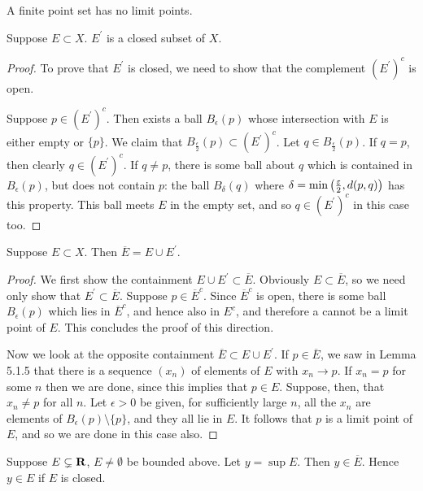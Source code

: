 \begin{corollary}
A finite point set has no limit points.
\end{corollary}

\begin{proposition}
Suppose $E\subset X$. $E^\prime$ is a closed subset of $X$.
\end{proposition}

\begin{proof}
To prove that $E^\prime$ is closed, we need to show that the complement $(E^\prime)^c$ is open.

Suppose $p\in (E^\prime)^c$. Then exists a ball $B_\epsilon(p)$ whose intersection with $E$ is either empty or $\{p\}$. We claim that $B_\frac{\epsilon}{2}(p)\subset (E^\prime)^c$. Let $q\in B_\frac{\epsilon}{2}(p)$. If $q=p$, then clearly $q\in (E^\prime)^c$. If $q\neq p$, there is some ball about $q$ which is contained in $B_\epsilon(p)$, but does not contain $p$: the ball $B_\delta(q)$ where $\delta=\min\left(\frac{\varepsilon}{2},d(p,q)\right)$ has this property. This ball meets $E$ in the empty set, and so $q\in (E^\prime)^c$ in this case too.
\end{proof}

\begin{proposition}
Suppose $E\subset X$. Then $\overline{E}=E\cup E^\prime$.
\end{proposition}

\begin{proof}
We first show the containment $E\cup E^\prime\subset\overline{E}$. Obviously $E\subset\overline{E}$, so we need only show that $E^\prime\subset\overline{E}$. Suppose $p\in\overline{E}^c$. Since $\overline{E}^c$ is open, there is some ball $B_\epsilon(p)$ which lies in $\overline{E}^c$, and hence also in $E^c$, and therefore a cannot be a limit point of $E$. This concludes the proof of this direction.

Now we look at the opposite containment $\overline{E}\subset E\cup E^\prime$. If $p\in\overline{E}$, we saw in Lemma 5.1.5 that there is a sequence  $(x_n)$ of elements of $E$ with $x_n\to p$. If $x_n=p$ for some $n$ then we are done, since this implies that $p\in E$. Suppose, then, that $x_n\neq p$ for all $n$. Let $\epsilon>0$ be given, for sufficiently large $n$, all the $x_n$ are elements of $B_\epsilon(p)\setminus\{p\}$, and they all lie in $E$. It follows that $p$ is a limit point of $E$, and so we are done in this case also.
\end{proof}

\begin{proposition}
Suppose $E\subsetneq\mathbf R$, $E\neq\emptyset$ be bounded above. Let $y=\sup E$. Then $y\in\overline{E}$. Hence $y\in E$ if $E$ is closed.
\end{proposition}

